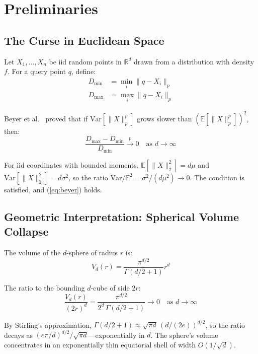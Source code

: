 \section{Preliminaries}
\label{sec:preliminaries}

\subsection{The Curse in Euclidean Space}

Let $X_1, \ldots, X_n$ be iid random points in $\mathbb{R}^d$ drawn from a distribution with density $f$. For a query point $q$, define:
\begin{align}
    D_{\min} &= \min_{i} \|q - X_i\|_p \\
    D_{\max} &= \max_{i} \|q - X_i\|_p
\end{align}

Beyer et al.~\cite{beyer1999curse} proved that if $\text{Var}[\|X\|_p^p]$ grows slower than $(\mathbb{E}[\|X\|_p^p])^2$, then:
\begin{equation}
    \frac{D_{\max} - D_{\min}}{D_{\min}} \xrightarrow{p} 0 \quad \text{as } d \to \infty
    \label{eq:beyer}
\end{equation}

For iid coordinates with bounded moments, $\mathbb{E}[\|X\|_2^2] = d\mu$ and $\text{Var}[\|X\|_2^2] = d\sigma^2$, so the ratio $\text{Var}/\mathbb{E}^2 = \sigma^2/(d\mu^2) \to 0$. The condition is satisfied, and (\ref{eq:beyer}) holds.

\subsection{Geometric Interpretation: Spherical Volume Collapse}

The volume of the $d$-sphere of radius $r$ is:
\begin{equation}
    V_d(r) = \frac{\pi^{d/2}}{\Gamma(d/2 + 1)} r^d
\end{equation}

The ratio to the bounding $d$-cube of side $2r$:
\begin{equation}
    \frac{V_d(r)}{(2r)^d} = \frac{\pi^{d/2}}{2^d \, \Gamma(d/2 + 1)} \to 0 \quad \text{as } d \to \infty
    \label{eq:volume_collapse}
\end{equation}

By Stirling's approximation, $\Gamma(d/2 + 1) \approx \sqrt{\pi d}\,(d/(2e))^{d/2}$, so the ratio decays as $(e\pi/d)^{d/2}/\sqrt{\pi d}$---exponentially in $d$. The sphere's volume concentrates in an exponentially thin equatorial shell of width $O(1/\sqrt{d})$.

